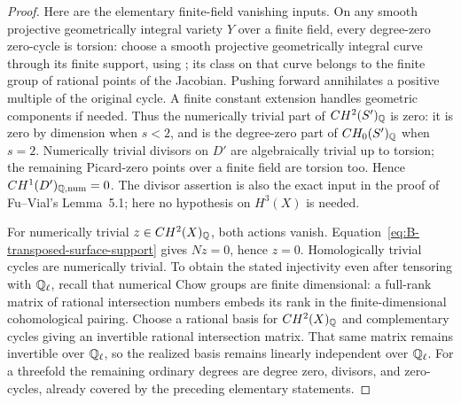 \begin{proof}
Here are the elementary finite-field vanishing inputs.  On any
smooth projective geometrically integral variety \(Y\) over a
finite field, every degree-zero zero-cycle is torsion: choose a
smooth projective geometrically integral curve through its finite
support, using \citet[Corollary~3.4, with Theorem~3.3 and its
proof]{DPoonen2004Bertini}; its class on that curve belongs to the
finite group of rational points of the Jacobian.  Pushing forward
annihilates a positive multiple of the original cycle.  A finite
constant extension handles geometric components if needed.
Thus the numerically trivial part of \(CH^2(S')_{\mathbb Q}\) is zero:
it is zero by dimension when \(s<2\), and is the degree-zero
part of \(CH_0(S')_{\mathbb Q}\) when \(s=2\).  Numerically trivial
divisors on \(D'\) are algebraically trivial up to torsion; the
remaining Picard-zero points over a finite field are torsion too.
Hence \(CH^1(D')_{\mathbb Q,\mathrm{num}}=0\).  The divisor assertion
is also the exact input in the proof of Fu--Vial's Lemma~5.1;
here no hypothesis on \(H^3(X)\) is needed.

For numerically trivial \(z\in CH^2(X)_{\mathbb Q}\), both actions vanish.
Equation~\eqref{eq:B-transposed-surface-support}
gives \(Nz=0\), hence \(z=0\).  Homologically trivial cycles
are numerically trivial.  To obtain the stated injectivity even
after tensoring with \(\mathbb Q_\ell\), recall that numerical Chow
groups are finite dimensional: a full-rank matrix of rational
intersection numbers embeds its rank in the finite-dimensional
cohomological pairing.  Choose a rational basis for \(CH^2(X)_{\mathbb Q}\)
and complementary cycles giving an invertible rational intersection
matrix.  That same matrix remains invertible over \(\mathbb Q_\ell\),
so the realized basis remains linearly independent over \(\mathbb Q_\ell\).
For a threefold the remaining ordinary degrees are degree zero,
divisors, and zero-cycles, already covered by the preceding
elementary statements.
\end{proof}


